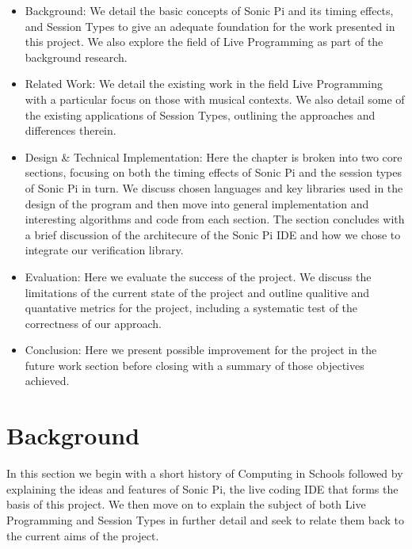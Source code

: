 \documentclass[11pt, abstracton, twoside]{scrartcl}
\begin{document}
\begin{itemize}
	\item Background: We detail the basic concepts of Sonic Pi and its timing 
	effects, and Session Types to give an adequate foundation for the work 
	presented in this project. We also explore the field of Live Programming 
	as part of the background research.
	\item Related Work: We detail the existing work in the field Live Programming
	with a particular focus on those with musical contexts. We also detail some
	of the existing applications of Session Types, outlining the approaches and
	differences therein.
	\item Design \& Technical Implementation: Here the chapter is broken into
	two core sections, focusing on both the timing effects of Sonic Pi and
	the session types of Sonic Pi in turn. We discuss chosen languages and key
	libraries used in the design of the program and then move into general
	implementation and interesting algorithms and code from each section. The
	section concludes with a brief discussion of the architecure of the Sonic 
	Pi IDE and how we chose to integrate our verification library.
	\item Evaluation: Here we evaluate the success of the project. We discuss
	the limitations of the current state of the project and outline qualitive
	and quantative metrics for the project, including a systematic test of
	the correctness of our approach.
	\item Conclusion: Here we present possible improvement for the project in
	the future work section before closing with a summary of those objectives
	achieved.
\end{itemize}
\newpage

\section{Background}
\thispagestyle{empty}
In this section we begin with a short history of Computing in Schools followed 
by explaining the ideas and features of Sonic Pi, the live coding IDE that forms 
the basis of this project. We then move on to explain the subject of both Live 
Programming and Session Types in further detail and seek to relate them back to 
the current aims of the project.
\end{document}
